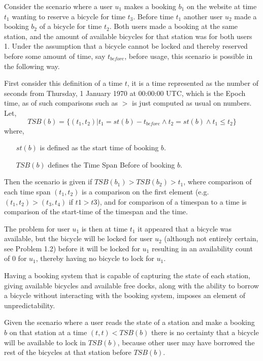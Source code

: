 \begin{description}[style=nextline]
\item[Problem 1.1] Consider the scenario where a user $u_1$ makes a booking $b_1$ on the website at time $t_1$ wanting to reserve a bicycle for time $t_3$. Before time $t_1$ another user $u_2$ made a booking $b_2$ of a bicycle for time $t_2$. Both users made a booking at the same station, and the amount of available bicycles for that station was for both users 1. Under the assumption that a bicycle cannot be locked and thereby reserved before some amount of time, say $t_{before}$, before usage, this scenario is possible in the following way.

First consider this definition of a time $t$, it is a time represented as the number of seconds from Thursday, 1 January 1970 at 00:00:00 UTC, which is the Epoch time, as of such comparisons such as $>$ is just computed as usual on numbers.
Let, 
$$TSB(b) = \{(t_1,t_2) | t_1 = st(b) - t_{before} \land t_2 = st(b) \land t_1 \leq t_2 \}$$
where,
\begin{itemize}[align = left]
	\item[$st(b)$] is defined as the start time of booking $b$.
	\item[$TSB(b)$] defines the Time Span Before of booking $b$.
\end{itemize} 

Then the scenario is given if $TSB(b_1) > TSB(b_2) > t_1$, where comparison of each time span $(t_1, t_2)$ is a comparison on the first element (e.g. $(t_1, t_2) > (t_3, t_4)$ if $t1 > t3$), and for comparison of a timespan to a time is comparison of the start-time of the timespan and the time.

The problem for user $u_1$ is then at time $t_1$ it appeared that a bicycle was available, but the bicycle will be locked for user $u_2$ (although not entirely certain, see Problem 1.2) before it will be locked for $u_1$ resulting in an availability count of 0 for $u_1$, thereby having no bicycle to lock for $u_1$.

\item[Problem 1.2] Having a booking system that is capable of capturing the state of each station, giving available bicycles and available free docks, along with the ability to borrow a bicycle without interacting with the booking system, imposes an element of unpredictability.

Given the scenario where a user reads the state of a station and make a booking $b$ on that station at a time $(t,t) < TSB(b)$ there is no certainty that a bicycle will be available to lock in $TSB(b)$, because other user may have borrowed the rest of the bicycles at that station before $TSB(b)$.


\end{description}
